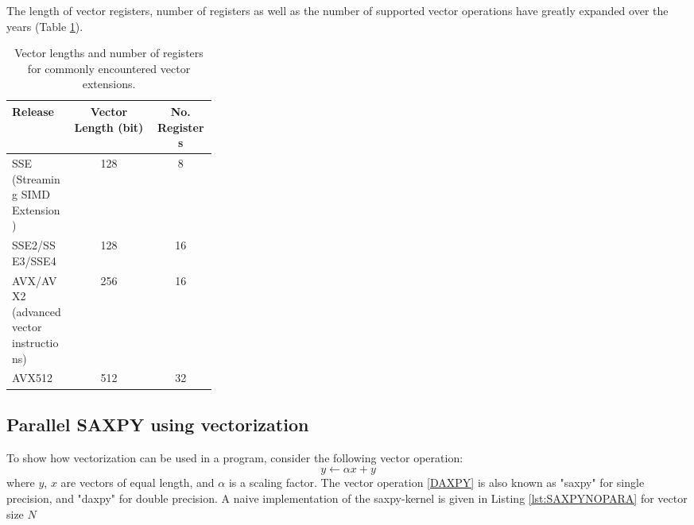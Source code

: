 The length of vector registers, number of registers as well as the number of supported vector operations have greatly expanded over the years (Table \ref{VECTORHARDWARE}).

\begin{table}
\makegapedcells
\centering
\begin{tabular}{p{0.3\linewidth}cc}
\hline
Release & Vector Length (bit) & No. Registers \\ \hline
SSE (Streaming SIMD Extension) & 128 & 8 \\ 
SSE2/SSE3/SSE4 & 128 & 16  \\
AVX/AVX2 (advanced vector instructions) & 256 & 16 \\
AVX512 & 512 & 32 \\ 
\hline 
\end{tabular}
\caption{Vector lengths and number of registers for commonly encountered vector extensions.}
\label{VECTORHARDWARE}
\end{table}

\subsection{Parallel SAXPY using vectorization}

To show how vectorization can be used in a program, consider the following vector operation:
\begin{equation}
y \leftarrow \alpha x + y
\label{DAXPY}
\end{equation}
\noindent where $y$, $x$ are vectors of equal length, and $\alpha$ is a scaling factor. The vector operation \ref{DAXPY} is also known as "saxpy" for single precision, and "daxpy" for double precision. A naive implementation of the saxpy-kernel is given in Listing \ref{lst:SAXPYNOPARA} for vector size $N$  


